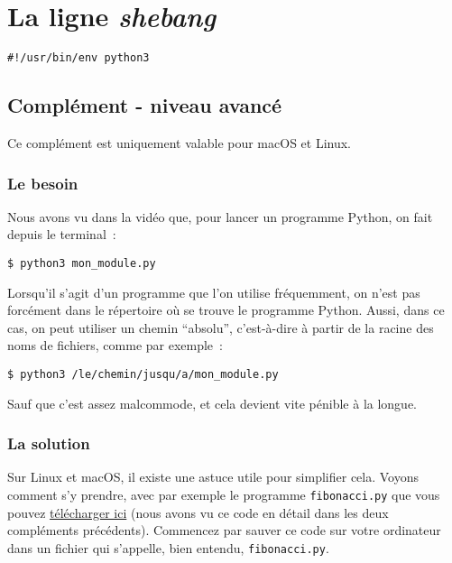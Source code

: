     \hypertarget{la-ligne-shebang}{%
\section{\texorpdfstring{La ligne
\emph{shebang}}{La ligne shebang}}\label{la-ligne-shebang}}

    \begin{verbatim}
#!/usr/bin/env python3
\end{verbatim}

    \hypertarget{compluxe9ment---niveau-avancuxe9}{%
\subsection{Complément - niveau
avancé}\label{compluxe9ment---niveau-avancuxe9}}

    Ce complément est uniquement valable pour macOS et Linux.

    \hypertarget{le-besoin}{%
\subsubsection{Le besoin}\label{le-besoin}}

    Nous avons vu dans la vidéo que, pour lancer un programme Python, on
fait depuis le terminal~:

    \begin{verbatim}
$ python3 mon_module.py
\end{verbatim}

    Lorsqu'il s'agit d'un programme que l'on utilise fréquemment, on n'est
pas forcément dans le répertoire où se trouve le programme Python.
Aussi, dans ce cas, on peut utiliser un chemin ``absolu'', c'est-à-dire
à partir de la racine des noms de fichiers, comme par exemple~:

    \begin{verbatim}
$ python3 /le/chemin/jusqu/a/mon_module.py
\end{verbatim}

    Sauf que c'est assez malcommode, et cela devient vite pénible à la
longue.

    \hypertarget{la-solution}{%
\subsubsection{La solution}\label{la-solution}}

    Sur Linux et macOS, il existe une astuce utile pour simplifier cela.
Voyons comment s'y prendre, avec par exemple le programme
\texttt{fibonacci.py} que vous pouvez
\href{data/fibonacci.py}{télécharger ici} (nous avons vu ce code en
détail dans les deux compléments précédents). Commencez par sauver ce
code sur votre ordinateur dans un fichier qui s'appelle, bien entendu,
\texttt{fibonacci.py}.\\

